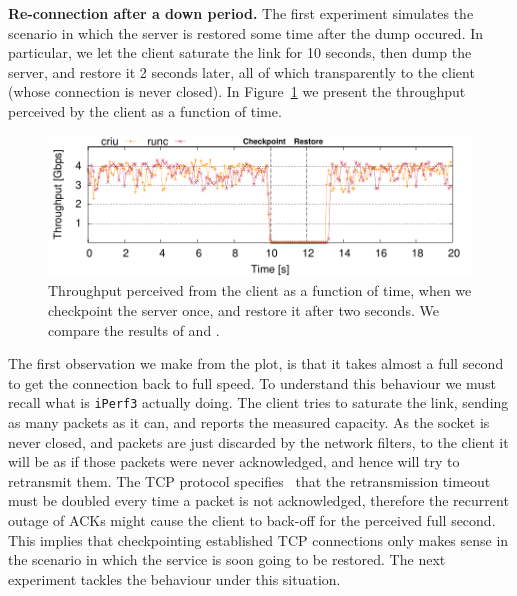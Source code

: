 \textbf{Re-connection after a down period.}
The first experiment simulates the scenario in which the server is restored some time after the dump occured.
In particular, we let the client saturate the link for 10 seconds, then dump the server, and restore it 2 seconds later, all of which transparently to the client (whose connection is never closed).
In Figure~\ref{fig:evaluation-downtime} we present the throughput perceived by the client as a function of time. 
\begin{figure}[h!]
    \centering
    \includegraphics[width=\linewidth]{./figs/tcp-established-downtime/tcp_established_downtime_microbenchmark.pdf}
    \caption{Throughput perceived from the client as a function of time, when we checkpoint the server once, and restore it after two seconds. We compare the results of \criu and \runc. \label{fig:evaluation-downtime}}
\end{figure}
The first observation we make from the plot, is that it takes almost a full second to get the connection back to full speed.
To understand this behaviour we must recall what is \texttt{iPerf3} actually doing.
The client tries to saturate the link, sending as many packets as it can, and reports the measured capacity.
As the socket is never closed, and packets are just discarded by the network filters, to the client it will be as if those packets were never acknowledged, and hence will try to retransmit them.
The TCP protocol specifies~\cite{tcp-rfc} that the retransmission timeout must be doubled every time a packet is not acknowledged, therefore the recurrent outage of ACKs might cause the client to back-off for the perceived full second.
This implies that checkpointing established TCP connections only makes sense in the scenario in which the service is soon going to be restored.
The next experiment tackles the behaviour under this situation.

